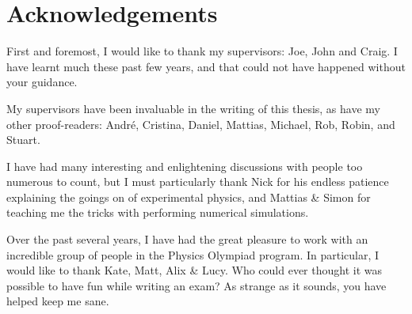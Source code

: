 \chapter*{Acknowledgements}
\graphicspath{{Figures/Common/}}









First and foremost, I would like to thank my supervisors: Joe, John and Craig.  I have learnt much these past few years, and that could not have happened without your guidance.  

My supervisors have been invaluable in the writing of this thesis, as have my other proof-readers: André, Cristina, Daniel, Mattias, Michael, Rob, Robin, and Stuart.

I have had many interesting and enlightening discussions with people too numerous to count, but I must particularly thank Nick for his endless patience explaining the goings on of experimental physics, and Mattias \& Simon for teaching me the tricks with performing numerical simulations.

Over the past several years, I have had the great pleasure to work with an incredible group of people in the Physics Olympiad program.  In particular, I would like to thank Kate, Matt, Alix \& Lucy.  Who could ever thought it was possible to have fun while writing an exam?  As strange as it sounds, you have helped keep me sane.

